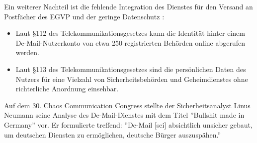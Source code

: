Ein weiterer Nachteil ist die fehlende Integration des Dienstes für den Versand an Postfächer des EGVP und der geringe Datenschutz \textcite{bea:demail}:
\begin{itemize}
	\item Laut §112 des Telekommunikationsgesetzes kann die Identität hinter einem De-Mail-Nutzerkonto von etwa 250 registrierten Behörden online abgerufen werden.
	\item Laut §113 des Telekommunikationsgesetzes sind die persönlichen Daten des Nutzers für eine Vielzahl von Sicherheitsbehörden und Geheimdienstes ohne richterliche Anordnung einsehbar.
\end{itemize}

Auf dem 30. Chaos Communication Congress stellte der Sicherheitsanalyst Linus Neumann seine Analyse des De-Mail-Dienstes mit dem Titel ''Bullshit made in Germany'' vor. Er formulierte treffend: ''De-Mail [sei] absichtlich unsicher gebaut, um deutschen Diensten zu ermöglichen, deutsche Bürger auszuspähen.''\textcite{bea:demail:bullshit}
 